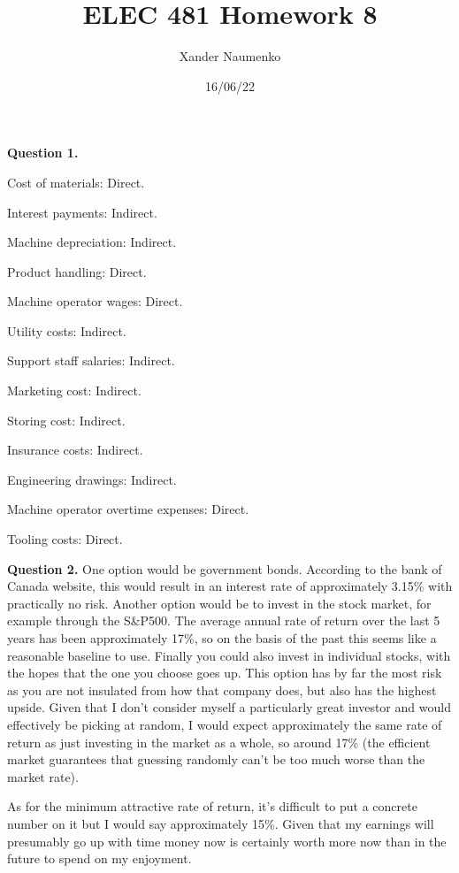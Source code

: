 \documentclass[letterpaper, reqno,11pt]{article}
\begin{document}
\title{ELEC 481 Homework 8}
\date{16/06/22}
\author{Xander Naumenko}
\maketitle

{\noindent\bf Question 1.} 

Cost of materials: Direct. 

Interest payments: Indirect. 

Machine depreciation: Indirect. 

Product handling: Direct. 

Machine operator wages: Direct. 

Utility costs: Indirect. 

Support staff salaries: Indirect. 

Marketing cost: Indirect. 

Storing cost: Indirect. 

Insurance costs: Indirect. 

Engineering drawings: Indirect. 

Machine operator overtime expenses: Direct. 

Tooling costs: Direct. 

{\noindent\bf Question 2.} One option would be government bonds. According to the bank of Canada website, this would result in an interest rate of approximately 3.15\% with practically no risk. Another option would be to invest in the stock market, for example through the S&P500. The average annual rate of return over the last 5 years has been approximately 17\%, so on the basis of the past this seems like a reasonable baseline to use. Finally you could also invest in individual stocks, with the hopes that the one you choose goes up. This option has by far the most risk as you are not insulated from how that company does, but also has the highest upside. Given that I don't consider myself a particularly great investor and would effectively be picking at random, I would expect approximately the same rate of return as just investing in the market as a whole, so around 17\% (the efficient market guarantees that guessing randomly can't be too much worse than the market rate). 

As for the minimum attractive rate of return, it's difficult to put a concrete number on it but I would say approximately 15\%. Given that my earnings will presumably go up with time money now is certainly worth more now than in the future to spend on my enjoyment. 
\end{document}
